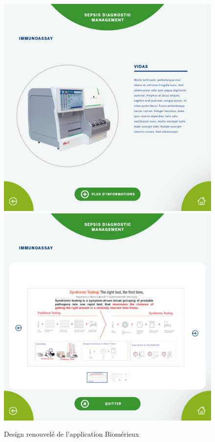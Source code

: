 \documentclass{article}
\begin{document}
\begin{figure}[h]
    \includegraphics[scale=0.095]{bmx-3-new.jpg}
    \includegraphics[scale=0.095]{bmx-4-new.jpg}
    \caption{Design renouvelé de l'application Biomérieux}
\end{figure}
\end{document}
